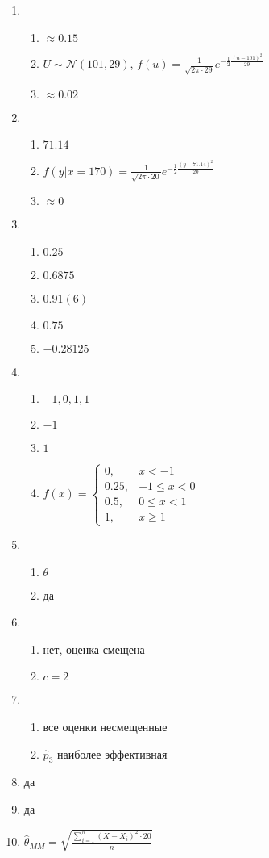 \documentclass[12pt]{article}
\def \cN{\mathcal{N}}
\begin{document}
\begin{enumerate}
\item 
\begin{enumerate}
\item $\approx 0.15$
\item $U \sim \cN(101,29)$, $f(u) = \frac{1}{\sqrt{2\pi\cdot 29}}e^{-\frac{1}{2}\frac{(u-101)^2}{29}}$
\item $\approx 0.02$
\end{enumerate}
\item 
\begin{enumerate}
\item $71.14$
\item $f(y|x=170) = \frac{1}{\sqrt{2\pi\cdot20}}e^{-\frac{1}{2}\frac{(y-71.14)^2}{20}}$
\item $\approx 0$
\end{enumerate}
\item
\begin{enumerate}
\item $0.25$
\item $0.6875$
\item $0.91(6)$
\item $0.75$
\item $-0.28125$
\end{enumerate}
\item
\begin{enumerate}
\item $-1, 0, 1, 1$
\item $-1$
\item $1$
\item $f(x) = \begin{cases}
0, & x < -1 \\
0.25, & -1 \leq x < 0 \\
0.5, & 0 \leq x < 1 \\
1, & x \geq 1
\end{cases}$
\end{enumerate}
\item 
\begin{enumerate}
\item $\theta$
\item да
\end{enumerate}

\item 
\begin{enumerate}
\item нет, оценка смещена
\item $c = 2$ 	
\end{enumerate}
\item 
\begin{enumerate}
\item все оценки несмещенные
\item $\hat{p}_3$ наиболее эффективная
\end{enumerate}	
\item да
\item да
\item $\hat{\theta}_{MM} = \sqrt{\frac{\sum_{i=1}^n(X-X_{i})^2\cdot20}{n}}$


\end{enumerate}
\end{document}
